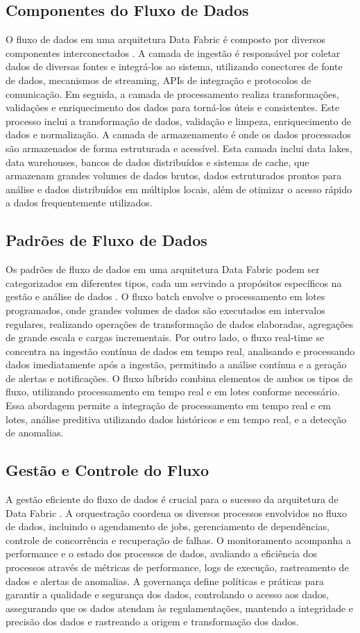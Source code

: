 \subsection{Componentes do Fluxo de Dados}
O fluxo de dados em uma arquitetura Data Fabric é composto por diversos componentes interconectados \cite{hechler2023data}. A camada de ingestão é responsável por coletar dados de diversas fontes e integrá-los ao sistema, utilizando conectores de fonte de dados, mecanismos de streaming, APIs de integração e protocolos de comunicação. Em seguida, a camada de processamento realiza transformações, validações e enriquecimento dos dados para torná-los úteis e consistentes. Este processo inclui a transformação de dados, validação e limpeza, enriquecimento de dados e normalização.
A camada de armazenamento é onde os dados processados são armazenados de forma estruturada e acessível. Esta camada inclui data lakes, data warehouses, bancos de dados distribuídos e sistemas de cache, que armazenam grandes volumes de dados brutos, dados estruturados prontos para análise e dados distribuídos em múltiplos locais, além de otimizar o acesso rápido a dados frequentemente utilizados.
\subsection{Padrões de Fluxo de Dados}
Os padrões de fluxo de dados em uma arquitetura Data Fabric podem ser categorizados em diferentes tipos, cada um servindo a propósitos específicos na gestão e análise de dados \cite{blohm2024data}. O fluxo batch envolve o processamento em lotes programados, onde grandes volumes de dados são executados em intervalos regulares, realizando operações de transformação de dados elaboradas, agregações de grande escala e cargas incrementais. Por outro lado, o fluxo real-time se concentra na ingestão contínua de dados em tempo real, analisando e processando dados imediatamente após a ingestão, permitindo a análise contínua e a geração de alertas e notificações.
O fluxo híbrido combina elementos de ambos os tipos de fluxo, utilizando processamento em tempo real e em lotes conforme necessário. Essa abordagem permite a integração de processamento em tempo real e em lotes, análise preditiva utilizando dados históricos e em tempo real, e a detecção de anomalias.
\subsection{Gestão e Controle do Fluxo}
A gestão eficiente do fluxo de dados é crucial para o sucesso da arquitetura de Data Fabric \cite{gade2024data}. A orquestração coordena os diversos processos envolvidos no fluxo de dados, incluindo o agendamento de jobs, gerenciamento de dependências, controle de concorrência e recuperação de falhas. O monitoramento acompanha a performance e o estado dos processos de dados, avaliando a eficiência dos processos através de métricas de performance, logs de execução, rastreamento de dados e alertas de anomalias.
A governança define políticas e práticas para garantir a qualidade e segurança dos dados, controlando o acesso aos dados, assegurando que os dados atendam às regulamentações, mantendo a integridade e precisão dos dados e rastreando a origem e transformação dos dados.

